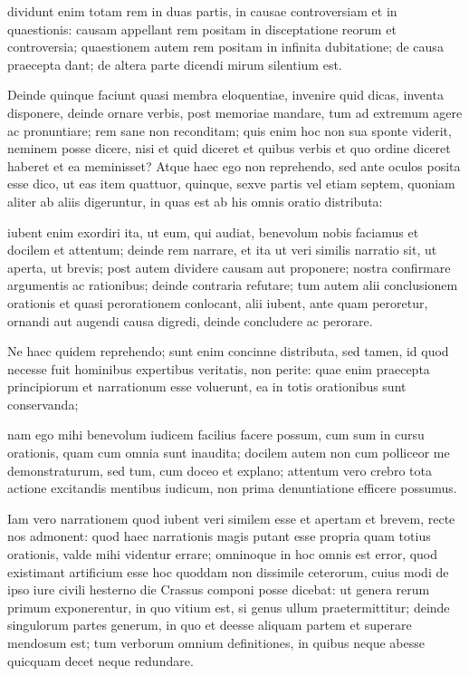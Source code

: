  dividunt enim totam rem in duas partis, in causae controversiam et in quaestionis: causam appellant rem positam in disceptatione reorum et controversia; quaestionem autem rem positam in infinita dubitatione; de causa praecepta dant; de altera parte dicendi mirum silentium est.

 Deinde quinque faciunt quasi membra eloquentiae, invenire quid dicas, inventa disponere, deinde ornare verbis, post memoriae mandare, tum ad extremum agere ac pronuntiare; rem sane non reconditam; quis enim hoc non sua sponte viderit, neminem posse dicere, nisi et quid diceret et quibus verbis et quo ordine diceret haberet et ea meminisset? Atque haec ego non reprehendo, sed ante oculos posita esse dico, ut eas item quattuor, quinque, sexve partis vel etiam septem, quoniam aliter ab aliis digeruntur, in quas est ab his omnis oratio distributa:

 iubent enim exordiri ita, ut eum, qui audiat, benevolum nobis faciamus et docilem et attentum; deinde rem narrare, et ita ut veri similis narratio sit, ut aperta, ut brevis; post autem dividere causam aut proponere; nostra confirmare argumentis ac rationibus; deinde contraria refutare; tum autem alii conclusionem orationis et quasi perorationem conlocant, alii iubent, ante quam peroretur, ornandi aut augendi causa digredi, deinde concludere ac perorare.

 Ne haec quidem reprehendo; sunt enim concinne distributa, sed tamen, id quod necesse fuit hominibus expertibus veritatis, non perite: quae enim praecepta principiorum et narrationum esse voluerunt, ea in totis orationibus sunt conservanda;

 nam ego mihi benevolum iudicem facilius facere possum, cum sum in cursu orationis, quam cum omnia sunt inaudita; docilem autem non cum polliceor me demonstraturum, sed tum, cum doceo et explano; attentum vero crebro tota actione excitandis mentibus iudicum, non prima denuntiatione efficere possumus.

 Iam vero narrationem quod iubent veri similem esse et apertam et brevem, recte nos admonent: quod haec narrationis magis putant esse propria quam totius orationis, valde mihi videntur errare; omninoque in hoc omnis est error, quod existimant artificium esse hoc quoddam non dissimile ceterorum, cuius modi de ipso iure civili hesterno die Crassus componi posse dicebat: ut genera rerum primum exponerentur, in quo vitium est, si genus ullum praetermittitur; deinde singulorum partes generum, in quo et deesse aliquam partem et superare mendosum est; tum verborum omnium definitiones, in quibus neque abesse quicquam decet neque redundare.

